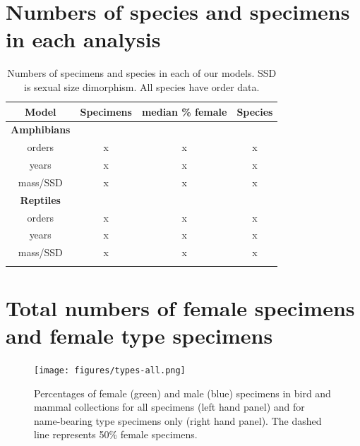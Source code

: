 \documentclass[a4paper, 12pt]{article}
\begin{document}

% 

\newpage
\section{Numbers of species and specimens in each analysis}

\begin{table}[H]
\centering
\begin{tabular}{cccc}

  \hline
  \textbf{Model} & \textbf{Specimens} & \textbf{median \% female} & \textbf{Species}\\ 
  \hline
  \textbf{Amphibians} & & &\\
  \hline
  orders & x & x & x\\
  years & x & x & x\\
  mass/SSD & x & x & x\\
  \hline
  \textbf{Reptiles} &&&\\
  \hline
  orders & x & x & x\\
  years & x & x & x\\
  mass/SSD & x & x & x\\
  \hline

\label{table_numbers}
\end{tabular}
\caption{Numbers of specimens and species in each of our models. SSD is sexual size dimorphism. All species have order data.} 

\end{table}
\newpage
\section{Total numbers of female specimens and female type specimens}

\begin{figure}[H]
 \centering
  \texttt{[image: figures/types-all.png]}
  \caption{Percentages of female (green) and male (blue) specimens in bird and mammal collections for all specimens (left hand panel) and for name-bearing type specimens only (right hand panel). 
  The dashed line represents 50\% female specimens.}
  \label{fig-types}
\end{figure}
\end{document}
